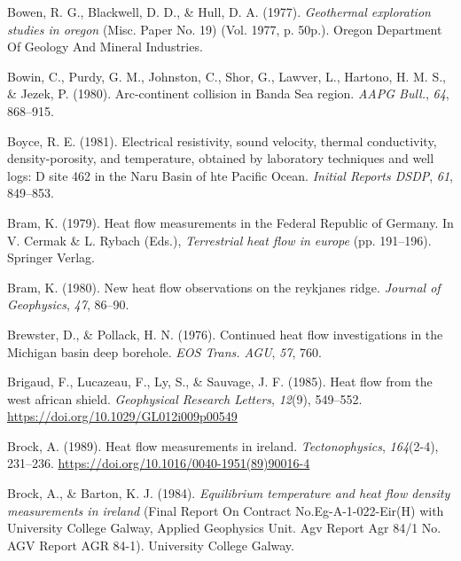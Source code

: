 \documentclass[draft,linenumbers]{agujournal2018}
\begin{document}
\leavevmode{}%
Bowen, R. G., Blackwell, D. D., \& Hull, D. A. (1977). \emph{Geothermal
exploration studies in oregon} (Misc. Paper No. 19) (Vol. 1977, p.
50p.). Oregon Department Of Geology And Mineral Industries.

\leavevmode{}%
Bowin, C., Purdy, G. M., Johnston, C., Shor, G., Lawver, L., Hartono, H.
M. S., \& Jezek, P. (1980). Arc-continent collision in {Banda Sea}
region. \emph{AAPG Bull.}, \emph{64}, 868--915.

\leavevmode{}%
Boyce, R. E. (1981). Electrical resistivity, sound velocity, thermal
conductivity, density-porosity, and temperature, obtained by laboratory
techniques and well logs: D site 462 in the {Naru Basin of hte Pacific
Ocean}. \emph{Initial Reports DSDP}, \emph{61}, 849--853.

\leavevmode{}%
Bram, K. (1979). Heat flow measurements in the {Federal Republic of
Germany}. In V. Cermak \& L. Rybach (Eds.), \emph{Terrestrial heat flow
in europe} (pp. 191--196). Springer Verlag.

\leavevmode{}%
Bram, K. (1980). New heat flow observations on the reykjanes ridge.
\emph{Journal of Geophysics}, \emph{47}, 86--90.

\leavevmode{}%
Brewster, D., \& Pollack, H. N. (1976). Continued heat flow
investigations in the {Michigan} basin deep borehole. \emph{EOS Trans.
AGU}, \emph{57}, 760.

\leavevmode{}%
Brigaud, F., Lucazeau, F., Ly, S., \& Sauvage, J. F. (1985). Heat flow
from the west african shield. \emph{Geophysical Research Letters},
\emph{12}(9), 549--552. \url{https://doi.org/10.1029/GL012i009p00549}

\leavevmode{}%
Brock, A. (1989). Heat flow measurements in ireland.
\emph{Tectonophysics}, \emph{164}(2-4), 231--236.
\url{https://doi.org/10.1016/0040-1951(89)90016-4}

\leavevmode{}%
Brock, A., \& Barton, K. J. (1984). \emph{Equilibrium temperature and
heat flow density measurements in ireland} (Final Report On Contract
No.Eg-A-1-022-Eir(H) with University College Galway, Applied Geophysics
Unit. Agv Report Agr 84/1 No. AGV Report AGR 84-1). University College
Galway.
\end{document}
